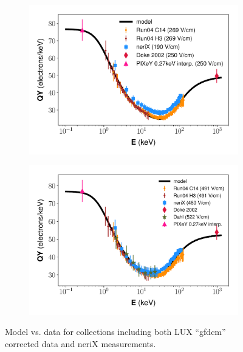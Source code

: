 \begin{figure}[!h]
\centering
\begin{subfigure}{0.5\linewidth}
\includegraphics[width=\linewidth]{Figures/Yields_fit_new/NEST_fit_250Vcm_new.pdf}
\caption{}
\end{subfigure}%
\begin{subfigure}{0.5\linewidth}
\includegraphics[width=\linewidth]{Figures/Yields_fit_new/NEST_fit_491Vcm_new.pdf}
\caption{}
\end{subfigure}
\caption{Model vs. data for collections including both LUX ``gfdcm'' corrected data and neriX measurements.}
\label{fig:betamod_nerixcomp}
\end{figure}

